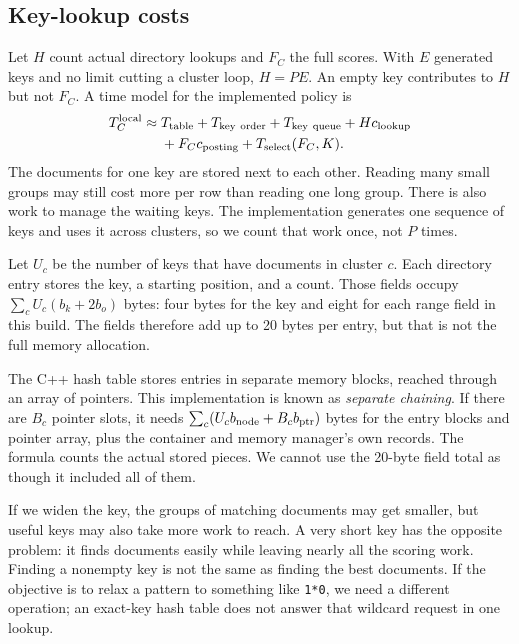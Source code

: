 \subsection{Key-lookup costs}
Let $H$ count actual directory lookups and $F_C$ the full scores. With $E$ generated keys and
no limit cutting a cluster loop, $H=PE$. An empty key contributes to $H$ but not $F_C$. A time
model for the implemented policy is
\begin{equation}
\begin{split}
T_C^{\rm local}\approx{}&T_{\rm table}+T_{\rm key\ order}+T_{\rm key\ queue}
 +Hc_{\rm lookup}\\
 &+F_Cc_{\rm posting}+T_{\rm select}(F_C,K).
\end{split}
\label{eq:key-time}
\end{equation}
The documents for one key are stored next to each other. Reading many small groups may still
cost more per row than reading one long group. There is also work to manage the waiting keys.
The implementation generates one sequence of keys and uses it across clusters, so we count
that work once, not $P$ times.

Let $U_c$ be the number of keys that have documents in cluster $c$. Each directory entry stores
the key, a starting position, and a count. Those fields occupy
$\sum_c U_c(b_k+2b_o)$ bytes: four bytes for the key and eight for each range field in this build.
The fields therefore add up to 20 bytes per entry, but that is not the full memory allocation.

The C++ hash table stores entries in separate memory blocks, reached through an array of
pointers. This implementation is known as \emph{separate chaining}. If there are $B_c$ pointer
slots, it needs $\sum_c(U_cb_{\rm node}+B_cb_{\rm ptr})$ bytes for the entry blocks and pointer
array, plus the container and memory manager's own records. The formula counts the actual
stored pieces. We cannot use the 20-byte field total as though it included all of them.


If we widen the key, the groups of matching documents may get smaller, but useful keys may also take more work
to reach. A very short key has the opposite problem: it finds documents easily while leaving
nearly all the scoring work. Finding a nonempty key is not the same as finding the best
documents. If the objective is to relax a pattern to something like \texttt{1*0}, we need a different
operation; an exact-key hash table does not answer that wildcard request in one lookup.